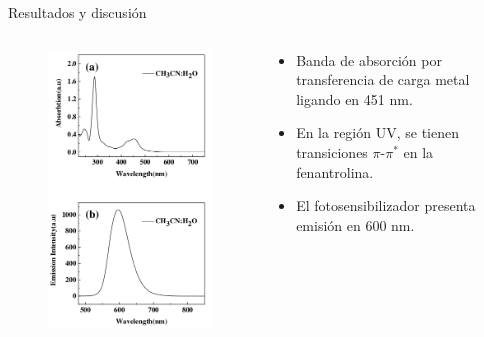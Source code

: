 \documentclass[handout]{beamer}
\begin{document}
\begin{frame}{Resultados y discusi\'on}
	\begin{columns}
		\begin{column}{0.4\textwidth}
			\begin{figure}[h]
				\centering
				\includegraphics[width=\linewidth]{sources/spectra}
			\end{figure}
		\end{column}
		\begin{column}{0.6\textwidth}
			\begin{itemize}
				\item Banda de absorci\'on por transferencia de carga metal ligando en 451 nm.
				\item En la regi\'on UV, se tienen transiciones $\pi$-$\pi^*$ en la fenantrolina.
				\item El fotosensibilizador presenta emisi\'on en 600 nm.
			\end{itemize}
		\end{column}
	\end{columns}
\end{frame}
\end{document}
